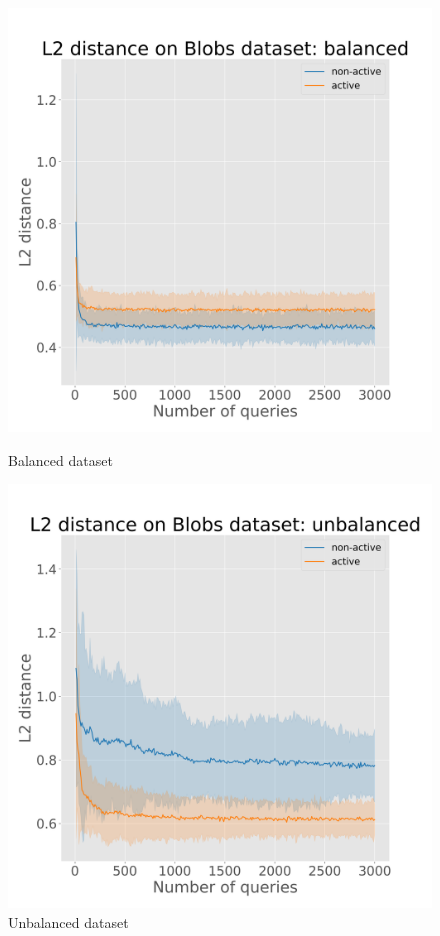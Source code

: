 \documentclass{article}
\begin{document}
\begin{figure}[!h]
  \centering
  \begin{minipage}{.45\textwidth}
    \centering
    \includegraphics[width=\linewidth]{active-vs-base-blobs-l2-loss_balanced-ci}
    \caption{Balanced dataset}\label{fig:linucb-blobs-l2-loss-balanced}
  \end{minipage}%
  \begin{minipage}{.45\textwidth}
    \centering
    \includegraphics[width=\linewidth]{active-vs-base-blobs-l2-loss_unbalanced-ci}
    \caption{Unbalanced dataset}\label{fig:linucb-blobs-l2-loss-unbalanced}
  \end{minipage}
\end{figure}
\end{document}
